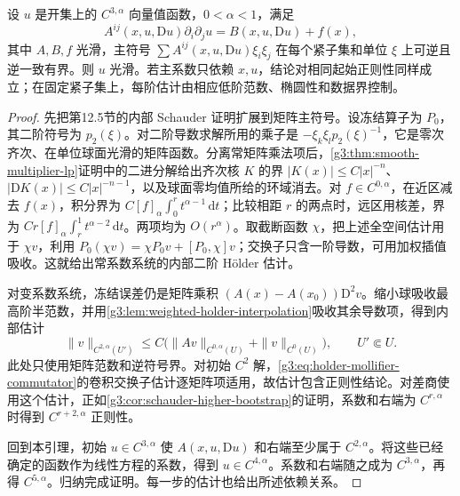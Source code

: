 \begin{lemma}\label{g3:lem:elliptic-system-holder-bootstrap}
	设 \(u\) 是开集上的 \(C^{3,\alpha}\) 向量值函数，\(0<\alpha<1\)，满足
	\[
		A^{ij}(x,u,\mathrm Du)\partial_i\partial_ju
		=B(x,u,\mathrm Du)+f(x),
	\]
	其中 \(A,B,f\) 光滑，主符号 \(\sum A^{ij}(x,u,\mathrm Du)\xi_i\xi_j\) 在每个紧子集和单位 \(\xi\) 上可逆且逆一致有界。则 \(u\) 光滑。若主系数只依赖 \(x,u\)，结论对相同起始正则性同样成立；在固定紧子集上，每阶估计由相应低阶范数、椭圆性和数据界控制。
\end{lemma}
\begin{proof}
	先把第12.5节的内部 Schauder 证明扩展到矩阵主符号。设冻结算子为 \(P_0\)，其二阶符号为 \(p_2(\xi)\)。对二阶导数求解所用的乘子是 \(-\xi_k\xi_l p_2(\xi)^{-1}\)，它是零次齐次、在单位球面光滑的矩阵函数。分离常矩阵乘法项后，\cref{g3:thm:smooth-multiplier-lp}证明中的二进分解给出齐次核 \(K\) 的界 \(|K(x)|\le C|x|^{-n}\)、\(|\mathrm DK(x)|\le C|x|^{-n-1}\)，以及球面零均值所给的环域消去。对 \(f\in C^{0,\alpha}\)，在近区减去 \(f(x)\)，积分界为 \(C[f]_\alpha\int_0^r t^{\alpha-1}\,\mathrm dt\)；比较相距 \(r\) 的两点时，远区用核差，界为 \(Cr[f]_\alpha\int_r^1t^{\alpha-2}\,\mathrm dt\)。两项均为 \(O(r^\alpha)\)。取截断函数 \(\chi\)，把上述全空间估计用于 \(\chi v\)，利用 \(P_0(\chi v)=\chi P_0v+[P_0,\chi]v\)；交换子只含一阶导数，可用加权插值吸收。这就给出常系数系统的内部二阶 Hölder 估计。

	对变系数系统，冻结误差仍是矩阵乘积 \((A(x)-A(x_0))\mathrm D^2v\)。缩小球吸收最高阶半范数，并用\cref{g3:lem:weighted-holder-interpolation}吸收其余导数项，得到内部估计
	\[
		\|v\|_{C^{2,\alpha}(U')}
		\le C\bigl(\|Av\|_{C^{0,\alpha}(U)}+\|v\|_{C^0(U)}\bigr),
		\qquad U'\Subset U.
	\]
	此处只使用矩阵范数和逆符号界。对初始 \(C^2\) 解，\cref{g3:eq:holder-mollifier-commutator}的卷积交换子估计逐矩阵项适用，故估计包含正则性结论。对差商使用这个估计，正如\cref{g3:cor:schauder-higher-bootstrap}的证明，系数和右端为 \(C^{r,\alpha}\) 时得到 \(C^{r+2,\alpha}\) 正则性。

	回到本引理，初始 \(u\in C^{3,\alpha}\) 使 \(A(x,u,\mathrm Du)\) 和右端至少属于 \(C^{2,\alpha}\)。将这些已经确定的函数作为线性方程的系数，得到 \(u\in C^{4,\alpha}\)。系数和右端随之成为 \(C^{3,\alpha}\)，再得 \(C^{5,\alpha}\)。归纳完成证明。每一步的估计也给出所述依赖关系。
\end{proof}

